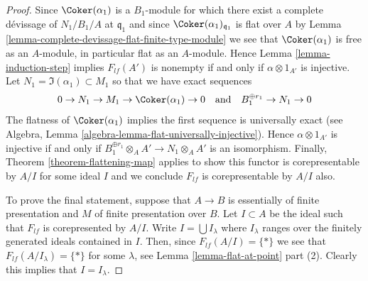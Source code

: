 \begin{proof}
\medskip\noindent
Since $\Coker(\alpha_1)$ is a $B_1$-module for which
there exist a complete d\'evissage of $N_1/B_1/A$ at $\mathfrak q_1$
and since $\Coker(\alpha_1)_{\mathfrak q_1}$ is
flat over $A$ by
Lemma \ref{lemma-complete-devissage-flat-finite-type-module}
we see that $\Coker(\alpha_1)$ is free as an $A$-module, in particular
flat as an $A$-module. Hence
Lemma \ref{lemma-induction-step}
implies $F_{lf}(A')$ is nonempty if and only if $\alpha \otimes 1_{A'}$
is injective. Let $N_1 = \Im(\alpha_1) \subset M_1$ so that
we have exact sequences
$$
0 \to N_1 \to M_1 \to \Coker(\alpha_1) \to 0
\quad\text{and}\quad
B_1^{\oplus r_1} \to N_1 \to 0
$$
The flatness of $\Coker(\alpha_1)$ implies the first sequence
is universally exact (see
Algebra, Lemma \ref{algebra-lemma-flat-universally-injective}).
Hence $\alpha \otimes 1_{A'}$ is injective if and only if
$B_1^{\oplus r_1} \otimes_A A' \to N_1 \otimes_A A'$
is an isomorphism. Finally,
Theorem \ref{theorem-flattening-map}
applies to show this functor is corepresentable by $A/I$ for some ideal $I$
and we conclude $F_{lf}$ is corepresentable by $A/I$ also.

\medskip\noindent
To prove the final statement, suppose that $A \to B$ is essentially of finite
presentation and $M$ of finite presentation over $B$. Let $I \subset A$
be the ideal such that $F_{lf}$ is corepresented by $A/I$.
Write $I = \bigcup I_\lambda$ where $I_\lambda$ ranges over the finitely
generated ideals contained in $I$. Then, since $F_{lf}(A/I) = \{*\}$
we see that $F_{lf}(A/I_\lambda) = \{*\}$ for some $\lambda$, see
Lemma \ref{lemma-flat-at-point} part (2).
Clearly this implies that $I = I_\lambda$.
\end{proof}